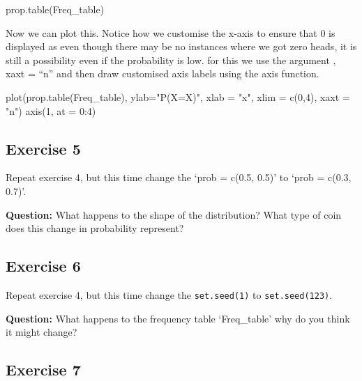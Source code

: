 \documentclass[
  10pt,
  letterpaper,
  DIV=11,
  numbers=noendperiod]{scrartcl}
\newenvironment{Shaded}{\begin{snugshade}}{\end{snugshade}}
\newcommand{\AttributeTok}[1]{\textcolor[rgb]{0.40,0.45,0.13}{#1}}
\newcommand{\DecValTok}[1]{\textcolor[rgb]{0.68,0.00,0.00}{#1}}
\newcommand{\FunctionTok}[1]{\textcolor[rgb]{0.28,0.35,0.67}{#1}}
\newcommand{\NormalTok}[1]{\textcolor[rgb]{0.00,0.23,0.31}{#1}}
\newcommand{\SpecialCharTok}[1]{\textcolor[rgb]{0.37,0.37,0.37}{#1}}
\newcommand{\StringTok}[1]{\textcolor[rgb]{0.13,0.47,0.30}{#1}}
\begin{document}
\begin{Shaded}
\begin{Highlighting}[]
\FunctionTok{prop.table}\NormalTok{(Freq\_table) }
\end{Highlighting}
\end{Shaded}

Now we can plot this. Notice how we customise the x-axis to ensure that
0 is displayed as even though there may be no instances where we got
zero heads, it is still a possibility even if the probability is low.
for this we use the argument , xaxt = ``n'' and then draw customised
axis labels using the axis function.

\begin{Shaded}
\begin{Highlighting}[]
\FunctionTok{plot}\NormalTok{(}\FunctionTok{prop.table}\NormalTok{(Freq\_table), }\AttributeTok{ylab=}\StringTok{"P(X=X)"}\NormalTok{, }\AttributeTok{xlab =} \StringTok{"x"}\NormalTok{, }\AttributeTok{xlim =} \FunctionTok{c}\NormalTok{(}\DecValTok{0}\NormalTok{,}\DecValTok{4}\NormalTok{), }\AttributeTok{xaxt =} \StringTok{"n"}\NormalTok{)}
\FunctionTok{axis}\NormalTok{(}\DecValTok{1}\NormalTok{, }\AttributeTok{at =} \DecValTok{0}\SpecialCharTok{:}\DecValTok{4}\NormalTok{)}
\end{Highlighting}
\end{Shaded}

\hypertarget{exercise-5}{%
\subsection{Exercise 5}\label{exercise-5}}

Repeat exercise 4, but this time change the `prob = c(0.5, 0.5)' to
`prob = c(0.3, 0.7)'.

\textbf{Question:} What happens to the shape of the distribution? What
type of coin does this change in probability represent?

\hypertarget{exercise-6}{%
\subsection{Exercise 6}\label{exercise-6}}

Repeat exercise 4, but this time change the \texttt{set.seed(1)} to
\texttt{set.seed(123)}.

\textbf{Question:} What happens to the frequency table `Freq\_table' why
do you think it might change?

\hypertarget{exercise-7}{%
\subsection{Exercise 7}\label{exercise-7}}
\end{document}
